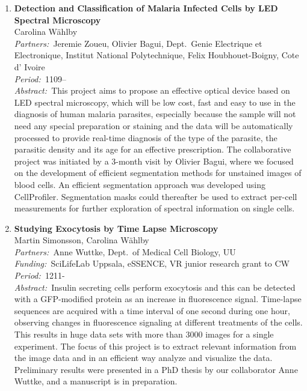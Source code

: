 \documentclass[10pt, a4paper]{article}
\newcommand{\aabstract}[1]{\emph{Abstract:~}#1}
\newcommand{\ffunding}[1]{\emph{Funding:~}#1\\}
\newcommand{\ppartners}[1]{\emph{Partners:~}#1\\}
\newcommand{\pperiod}[1]{\emph{Period:~}#1\\}
\begin{document}
\begin{enumerate}
\item \textbf{Detection and Classification of Malaria Infected Cells by LED Spectral Microscopy}\\
Carolina W\"{a}hlby\\
\ppartners{Jeremie Zoueu, Olivier Bagui, Dept.~Genie Electrique et Electronique, Institut National Polytechnique, Felix Houbhouet-Boigny, Cote d' Ivoire}
\pperiod{1109--}
\aabstract{This project aims to propose an effective optical device based on LED spectral microscopy, which will be low cost, fast and easy to use in the diagnosis of human malaria parasites, especially because the sample will not need any special preparation or staining and the data will be automatically processed to provide real-time diagnosis of the type of the parasite, the parasitic density and its age for an effective prescription. The collaborative project was initiated by a 3-month visit by Olivier Bagui, where we focused on the development of efficient segmentation methods for unstained images of blood cells. An efficient segmentation approach was developed using CellProfiler. Segmentation masks could thereafter be used to extract per-cell measurements for further exploration of spectral information on single cells.}


\item 
\textbf{Studying Exocytosis by Time Lapse Microscopy}\\
Martin Simonsson, Carolina W\"{a}hlby\\
\ppartners{Anne Wuttke, Dept.~of Medical Cell Biology, UU}
\ffunding{SciLifeLab Uppsala, eSSENCE, VR junior research grant to CW }
\pperiod{1211-}
\aabstract{Insulin secreting cells perform exocytosis and this can be detected with a GFP-modified protein as an increase in fluorescence signal. Time-lapse sequences are acquired with a time interval of one second during one hour, observing changes in fluorescence signaling at different treatments of the cells. This results in huge data sets with more than 3000 images for a single experiment. The focus of this project is to extract relevant information from the image data and in an efficient way analyze and visualize the data. Preliminary results were presented in a PhD thesis by our collaborator Anne Wuttke, and a manuscript is in preparation.}



\end{enumerate}
\end{document}
